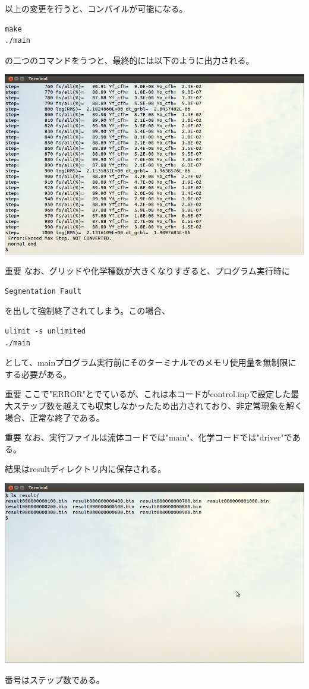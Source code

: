 \documentclass{jsarticle}
\begin{document}
以上の変更を行うと、コンパイルが可能になる。
\begin{verbatim}
make
./main
\end{verbatim}
の二つのコマンドをうつと、最終的には以下のように出力される。
\begin{center}
\includegraphics[width=.8\textwidth,bb=0 0 962 577]{tutorial_img/200.png}
\end{center}
\begin{itembox}[l]{重要}
なお、グリッドや化学種数が大きくなりすぎると、プログラム実行時に
\begin{verbatim}
Segmentation Fault
\end{verbatim}
を出して強制終了されてしまう。この場合、
\begin{verbatim}
ulimit -s unlimited
./main
\end{verbatim}
として、mainプログラム実行前にそのターミナルでのメモリ使用量を無制限にする必要がある。
\end{itembox}

\begin{itembox}[l]{重要}
ここで"ERROR"とでているが、これは本コードがcontrol.inpで設定した最大ステップ数を越えても収束しなかったため出力されており、非定常現象を解く場合、正常な終了である。
\end{itembox}
\begin{itembox}[l]{重要}
なお、実行ファイルは流体コードでは"main"、化学コードでは"driver"である。
\end{itembox}

結果はresultディレクトリ内に保存される。
\begin{center}
\includegraphics[width=.8\textwidth,bb=0 0 962 577]{tutorial_img/210.png}
\end{center}
番号はステップ数である。
\end{document}

